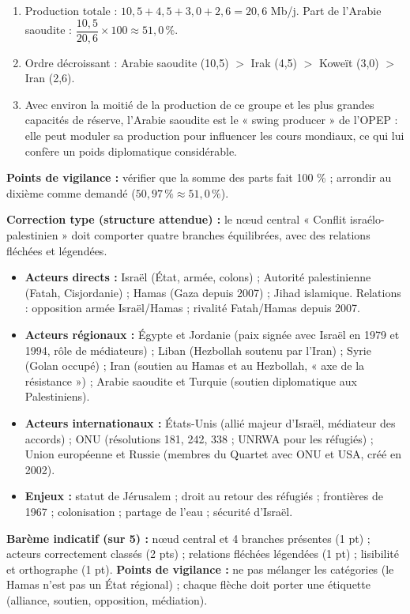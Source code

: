 \documentclass[11pt]{article}
\begin{document}
\begin{corrige}
\begin{enumerate}
    \item Production totale : $10,5 + 4,5 + 3,0 + 2,6 = 20,6$ Mb/j. Part de l'Arabie saoudite : $\dfrac{10,5}{20,6} \times 100 \approx 51,0\,\%$.
    \item Ordre décroissant : Arabie saoudite (10,5) $>$ Irak (4,5) $>$ Koweït (3,0) $>$ Iran (2,6).
    \item Avec environ la moitié de la production de ce groupe et les plus grandes capacités de réserve, l'Arabie saoudite est le « swing producer » de l'OPEP : elle peut moduler sa production pour influencer les cours mondiaux, ce qui lui confère un poids diplomatique considérable.
\end{enumerate}
\textbf{Points de vigilance :} vérifier que la somme des parts fait 100 \% ; arrondir au dixième comme demandé ($50,97\,\% \approx 51,0\,\%$).
\end{corrige}

\begin{corrige}
\textbf{Correction type (structure attendue) :} le nœud central « Conflit israélo-palestinien » doit comporter quatre branches équilibrées, avec des relations fléchées et légendées.
\begin{itemize}
    \item \textbf{Acteurs directs :} Israël (État, armée, colons) ; Autorité palestinienne (Fatah, Cisjordanie) ; Hamas (Gaza depuis 2007) ; Jihad islamique. Relations : opposition armée Israël/Hamas ; rivalité Fatah/Hamas depuis 2007.
    \item \textbf{Acteurs régionaux :} Égypte et Jordanie (paix signée avec Israël en 1979 et 1994, rôle de médiateurs) ; Liban (Hezbollah soutenu par l'Iran) ; Syrie (Golan occupé) ; Iran (soutien au Hamas et au Hezbollah, « axe de la résistance ») ; Arabie saoudite et Turquie (soutien diplomatique aux Palestiniens).
    \item \textbf{Acteurs internationaux :} États-Unis (allié majeur d'Israël, médiateur des accords) ; ONU (résolutions 181, 242, 338 ; UNRWA pour les réfugiés) ; Union européenne et Russie (membres du Quartet avec ONU et USA, créé en 2002).
    \item \textbf{Enjeux :} statut de Jérusalem ; droit au retour des réfugiés ; frontières de 1967 ; colonisation ; partage de l'eau ; sécurité d'Israël.
\end{itemize}
\textbf{Barème indicatif (sur 5) :} nœud central et 4 branches présentes (1 pt) ; acteurs correctement classés (2 pts) ; relations fléchées légendées (1 pt) ; lisibilité et orthographe (1 pt).
\textbf{Points de vigilance :} ne pas mélanger les catégories (le Hamas n'est pas un État régional) ; chaque flèche doit porter une étiquette (alliance, soutien, opposition, médiation).
\end{corrige}
\end{document}
